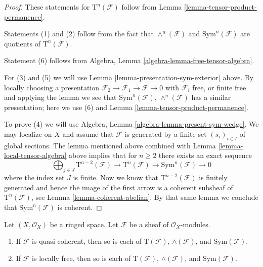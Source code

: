 \begin{proof}
These statements for $\text{T}^n(\mathcal{F})$ follow
from Lemma \ref{lemma-tensor-product-permanence}.

\medskip\noindent
Statements (1) and (2) follow from the fact that
$\wedge^n(\mathcal{F})$ and $\text{Sym}^n(\mathcal{F})$
are quotients of $\text{T}^n(\mathcal{F})$.

\medskip\noindent
Statement (6) follows from
Algebra, Lemma \ref{algebra-lemma-free-tensor-algebra}.

\medskip\noindent
For (3) and (5) we will use
Lemma \ref{lemma-presentation-sym-exterior} above.
By locally choosing a presentation
$\mathcal{F}_2 \to \mathcal{F}_1 \to \mathcal{F} \to 0$
with $\mathcal{F}_i$ free, or finite free and applying the
lemma we see that $\text{Sym}^n(\mathcal{F})$, $\wedge^n(\mathcal{F})$
has a similar presentation; here we use (6) and
Lemma \ref{lemma-tensor-product-permanence}.

\medskip\noindent
To prove (4) we will use
Algebra, Lemma \ref{algebra-lemma-present-sym-wedge}.
We may localize on $X$ and assume that
$\mathcal{F}$ is generated by a finite set
$(s_i)_{i \in I}$ of global sections.
The lemma mentioned above
combined with Lemma \ref{lemma-local-tensor-algebra} above
implies that for $n \geq 2$
there exists an exact sequence
$$
\bigoplus_{j \in J}
\text{T}^{n - 2}(\mathcal{F})
\to
\text{T}^n(\mathcal{F})
\to
\text{Sym}^n(\mathcal{F})
\to
0
$$
where the index set $J$ is finite. Now we know that
$\text{T}^{n - 2}(\mathcal{F})$ is finitely generated
and hence the image of the first arrow is a coherent
subsheaf of $\text{T}^n(\mathcal{F})$, see Lemma \ref{lemma-coherent-abelian}.
By that same lemma we conclude that $\text{Sym}^n(\mathcal{F})$ is
coherent.
\end{proof}

\begin{lemma}
\label{lemma-whole-tensor-algebra-permanence}
Let $(X, \mathcal{O}_X)$ be a ringed space.
Let $\mathcal{F}$ be a sheaf of $\mathcal{O}_X$-modules.
\begin{enumerate}
\item If $\mathcal{F}$ is quasi-coherent,
then so is each of $\text{T}(\mathcal{F})$,
$\wedge(\mathcal{F})$, and $\text{Sym}(\mathcal{F})$.
\item If $\mathcal{F}$ is locally free,
then so is each of $\text{T}(\mathcal{F})$,
$\wedge(\mathcal{F})$, and $\text{Sym}(\mathcal{F})$.
\end{enumerate}
\end{lemma}

